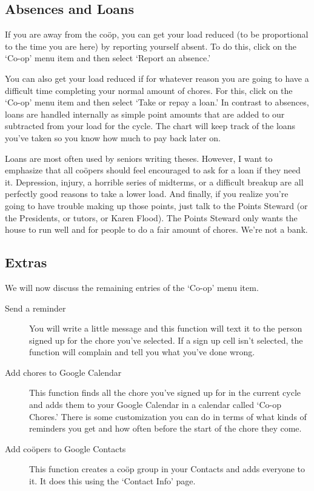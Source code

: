 \documentclass{article}
\begin{document}
\subsection{Absences and Loans}
If you are away from the co\"{o}p, you can get your load reduced (to be proportional to the time you are here) by reporting yourself absent.
To do this, click on the `Co-op' menu item and then select `Report an absence.'

You can also get your load reduced if for whatever reason you are going to have a difficult time completing your normal amount of chores. 
For this, click on the `Co-op' menu item and then select `Take or repay a loan.'
In contrast to absences, loans are handled internally as simple point amounts that are added to our subtracted from your load for the cycle.
The chart will keep track of the loans you've taken so you know how much to pay back later on.

Loans are most often used by seniors writing theses.
However, I want to emphasize that all co\"{o}pers should feel encouraged to ask for a loan if they need it.
Depression, injury, a horrible series of midterms, or a difficult breakup are all perfectly good reasons to take a lower load.
And finally, if you realize you're going to have trouble making up those points, just talk to the Points Steward (or the Presidents, or tutors, or Karen Flood).
The Points Steward only wants the house to run well and for people to do a fair amount of chores.
We're not a bank.  

\subsection{Extras}
We will now discuss the remaining entries of the `Co-op' menu item.

\begin{description}
\item[Send a reminder]
You will write a little message and this function will text it to the person signed up for the chore you've selected.
If a sign up cell isn't selected, the function will complain and tell you what you've done wrong.
\item[Add chores to Google Calendar]
This function finds all the chore you've signed up for in the current cycle and adds them to your Google Calendar in a calendar called `Co-op Chores.'
There is some customization you can do in terms of what kinds of reminders you get and how often before the start of the chore they come.
\item[Add co\"{o}pers to Google Contacts]
This function creates a co\"{o}p group in your Contacts and adds everyone to it.
It does this using the `Contact Info' page.
\end{description}
\end{document}
